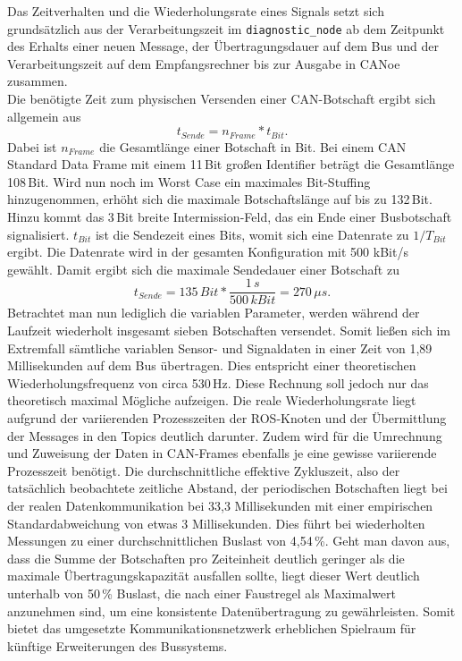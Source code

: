 Das Zeitverhalten und die Wiederholungsrate eines Signals setzt sich grundsätzlich aus der Verarbeitungszeit im \texttt{diagnostic\_node} ab dem Zeitpunkt des Erhalts einer neuen Message, der Übertragungsdauer auf dem Bus und der Verarbeitungszeit auf dem Empfangsrechner bis zur Ausgabe in CANoe zusammen. \\
Die benötigte Zeit zum physischen Versenden einer CAN-Botschaft ergibt sich allgemein aus
\begin{equation}
	t_{Sende} = n_{Frame} * t_{Bit}.
	\label{math:Formel1}
\end{equation}
Dabei ist $n_{Frame}$ die Gesamtlänge einer Botschaft in Bit. Bei einem CAN Standard Data Frame mit einem 11\,Bit großen Identifier beträgt die Gesamtlänge 108\,Bit. Wird nun noch im Worst Case ein maximales Bit-Stuffing hinzugenommen, erhöht sich die maximale Botschaftslänge auf bis zu 132\,Bit. Hinzu kommt das 3\,Bit breite Intermission-Feld, das ein Ende einer Busbotschaft signalisiert. $t_{Bit}$ ist die Sendezeit eines Bits, womit sich eine Datenrate zu $1/T_{Bit}$ ergibt. Die Datenrate wird in der gesamten Konfiguration mit 500 kBit/s gewählt. Damit ergibt sich die maximale Sendedauer einer Botschaft zu
\begin{equation}
	t_{Sende} = 135\,Bit * \frac{1\,s}{500\,kBit} = 270\,\mu s.
	\label{math:Formel2}
\end{equation}
Betrachtet man nun lediglich die variablen Parameter, werden während der Laufzeit wiederholt insgesamt sieben Botschaften versendet. Somit ließen sich im Extremfall sämtliche variablen Sensor- und Signaldaten in einer Zeit von 1,89\,Millisekunden auf dem Bus übertragen. Dies entspricht einer theoretischen Wiederholungsfrequenz von circa 530\,Hz. Diese Rechnung soll jedoch nur das theoretisch maximal Mögliche aufzeigen. Die reale Wiederholungsrate liegt aufgrund der variierenden Prozesszeiten der ROS-Knoten und der Übermittlung der Messages in den Topics deutlich darunter. Zudem wird für die Umrechnung und Zuweisung der Daten in CAN-Frames ebenfalls je eine gewisse variierende Prozesszeit benötigt. Die durchschnittliche effektive Zykluszeit, also der tatsächlich beobachtete zeitliche Abstand, der periodischen Botschaften liegt bei der realen Datenkommunikation bei 33,3 Millisekunden mit einer empirischen Standardabweichung von etwas 3 Millisekunden. Dies führt bei wiederholten Messungen zu einer durchschnittlichen Buslast von 4,54\,\%. Geht man davon aus, dass die Summe der Botschaften pro Zeiteinheit deutlich geringer als die maximale Übertragungskapazität ausfallen sollte, liegt dieser Wert deutlich unterhalb von 50\,\% Buslast, die nach einer Faustregel als Maximalwert anzunehmen sind, um eine konsistente Datenübertragung zu gewährleisten. Somit bietet das umgesetzte Kommunikationsnetzwerk erheblichen Spielraum für künftige Erweiterungen des Bussystems.\\
